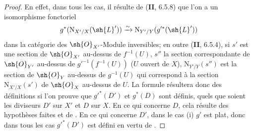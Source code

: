 \begin{proof}
En effet, dans tous les cas, il résulte de (\textbf{II}, 6.5.8) que l'on a un isomorphisme fonctoriel
\[
  g^*(\mathrm{N}_{X'/X}(\sh{L}'))\xrightarrow{\sim}\mathrm{N}_{Y'/Y}(g'^*(\sh{L}'))
\]
dans la catégorie des $\sh{O}_{X'}$-Module inversibles;
en outre (\textbf{II}, 6.5.4), si $s'$ est une section de $\sh{O}_{X'}$ au-dessus de $f^{-1}(U)$, $s''$ la section correspondante de $\sh{O}_{Y'}$ au-dessus de $g'^{-1}(f^{-1}(U))$ ($U$ ouvert de $X$), $\mathrm{N}_{Y'/Y}(s'')$ est la section de $\sh{O}_Y$ au-dessus de $g^{-1}(U)$ qui correspond à la section $\mathrm{N}_{X'/X}(s')$ de $\sh{O}_X$ au-dessus de $U$.
La formule  résultera donc des définitions si l'on prouve que $g'^*(D')$ et $g^*(D)$ sont définis, quels que soient les diviseurs $D'$ sur $X'$ et $D$ sur $X$.
En ce qui concerne $D$, cela résulte des hypothèses faites et de .
En ce qui concerne $D'$, dans le cas (i) $g'$ est plat, donc dans tous les cas $g'^*(D')$ est défini en vertu de .
\end{proof}
